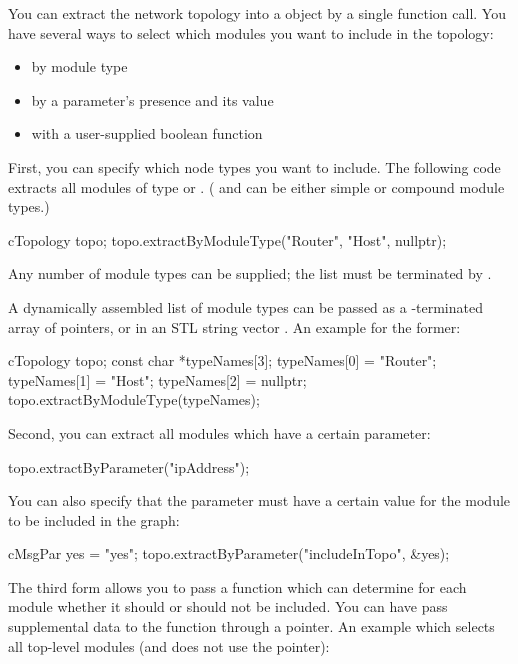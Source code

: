 You can extract the network topology into a 
object by a single function call. You have several ways to select
which modules you want to include in the topology:
\begin{itemize}
  \item{by module type}
  \item{by a parameter's presence and its value}
  \item{with a user-supplied boolean function}
\end{itemize}

First, you can specify which node types you want to include. The
following code extracts all modules of type  or .
( and  can be either simple or compound module types.)

\begin{cpp}
cTopology topo;
topo.extractByModuleType("Router", "Host", nullptr);
\end{cpp}

Any number of module types can be supplied; the list must be terminated by .

A dynamically assembled list of module types can be passed as a
-terminated array of  pointers, or
in an STL string vector .
An example for the former:

\begin{cpp}
cTopology topo;
const char *typeNames[3];
typeNames[0] = "Router";
typeNames[1] = "Host";
typeNames[2] = nullptr;
topo.extractByModuleType(typeNames);
\end{cpp}

Second, you can extract all modules which have a certain parameter:

\begin{cpp}
topo.extractByParameter("ipAddress");
\end{cpp}

You can also specify that the parameter must have a certain value
for the module to be included in the graph:

\begin{cpp}
cMsgPar yes = "yes";
topo.extractByParameter("includeInTopo", &yes);
\end{cpp}

The third form allows you to pass a function which can determine for
each module whether it should or should not be included.  You can have
 pass supplemental data to the function through a
 pointer. An example which selects all top-level modules (and
does not use the  pointer):

